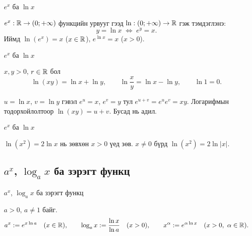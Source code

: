\begin{frame}[allowframebreaks]{$e^x$ ба $\ln x$}
\begin{definition}
$e^x:\mathbb{R}\to(0;+\infty)$ функцийн урвууг  гээд
$\ln:(0;+\infty)\to\mathbb{R}$ гэж тэмдэглэнэ:
\[
y=\ln x \;\Longleftrightarrow\; e^y=x.
\]
Иймд $\ln(e^x)=x$ \;($x\in\mathbb{R}$), \; $e^{\ln x}=x$ \;($x>0$).
\end{definition}

\begin{center}
\begin{fitbox}\end{fitbox}
\end{center}
\end{frame}

\begin{frame}[allowframebreaks]{$e^x$ ба $\ln x$}
\begin{theorem}
$x,y>0$, $r\in\mathbb{R}$ бол
\[
\ln(xy)=\ln x+\ln y,\qquad \ln\frac{x}{y}=\ln x-\ln y,\qquad \ln 1=0.
\]
\end{theorem}
\begin{prof}
$u=\ln x$, $v=\ln y$ гэвэл $e^u=x$, $e^v=y$ тул $e^{u+v}=e^ue^v=xy$. Логарифмын
тодорхойлолтоор $\ln(xy)=u+v$. Бусад нь адил.
\end{prof}
\end{frame}

\begin{frame}[allowframebreaks]{$e^x$ ба $\ln x$}
\begin{remark}
$\ln(x^2)=2\ln x$ нь зөвхөн $x>0$ үед зөв. $x\neq0$ бүрд $\ln(x^2)=2\ln|x|$.
\end{remark}
\end{frame}

\subsection{$a^x$, $\log_a x$ ба зэрэгт функц}
\begin{frame}[allowframebreaks]{$a^x$, $\log_a x$ ба зэрэгт функц}
\begin{definition}
$a>0$, $a\neq1$ байг.
\[
a^x:=e^{x\ln a}\quad(x\in\mathbb{R}),\qquad
\log_a x:=\frac{\ln x}{\ln a}\quad(x>0),\qquad
x^\alpha:=e^{\alpha\ln x}\quad(x>0,\ \alpha\in\mathbb{R}).
\]
\end{definition}
\end{frame}

